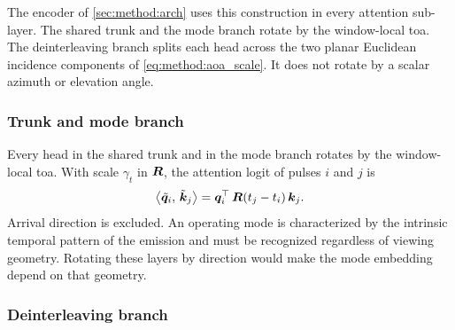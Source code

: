 The encoder of \cref{sec:method:arch} uses this construction in every attention sub-layer. The shared trunk and the mode branch rotate by the window-local \gls{toa}. The deinterleaving branch splits each head across the two planar Euclidean incidence components of \cref{eq:method:aoa_scale}. It does not rotate by a scalar azimuth or elevation angle.

\subsubsection*{Trunk and mode branch}

Every head in the shared trunk and in the mode branch rotates by the window-local \gls{toa}. With scale $\gamma_t$ in $\bm{R}$, the attention logit of pulses $i$ and $j$ is
\begin{equation}\label{eq:method:rope_toa}
  \bigl\langle \tilde{\bm{q}}_i,\, \tilde{\bm{k}}_j \bigr\rangle
  =
  \bm{q}_i^{\top}\,\bm{R}(t_j - t_i)\,\bm{k}_j.
\end{equation}
Arrival direction is excluded. An operating mode is characterized by the intrinsic temporal pattern of the emission and must be recognized regardless of viewing geometry. Rotating these layers by direction would make the mode embedding depend on that geometry.

\subsubsection*{Deinterleaving branch}

